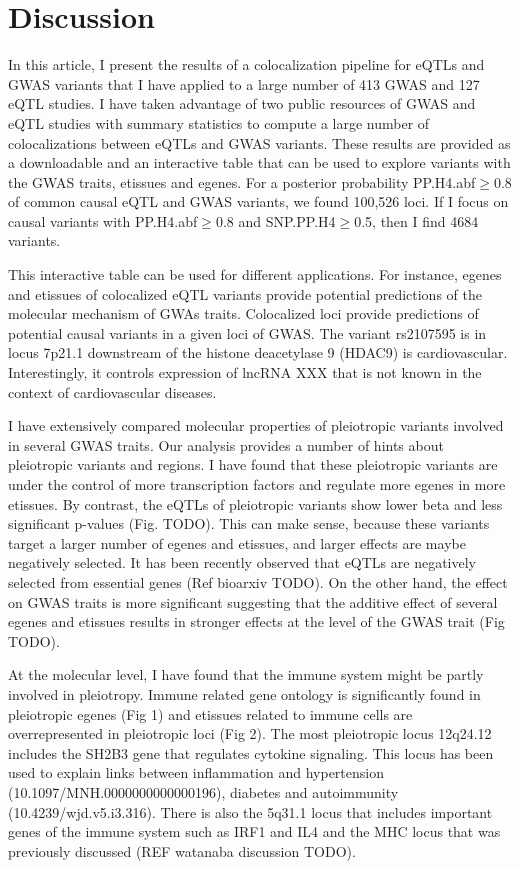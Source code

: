 \section*{Discussion}

In this article, I present the results of a colocalization pipeline for eQTLs and GWAS variants that I have applied to a large number of 413 GWAS and 127 eQTL studies.
%
I have taken advantage of two public resources of GWAS and eQTL studies with summary statistics to compute a large number of colocalizations between eQTLs and GWAS variants.
%
These results are provided as a downloadable and an interactive table that can be used to explore variants with the GWAS traits, etissues and egenes.
%
For a posterior probability PP.H4.abf$\ge$0.8 of common causal eQTL and GWAS variants, we found 100,526 loci.
%
If I focus on causal variants with PP.H4.abf$\ge$0.8 and SNP.PP.H4$\ge$0.5, then I find 4684 variants.

This interactive table can be used for different applications.
%
For instance, egenes and etissues of colocalized eQTL variants provide potential predictions of the molecular mechanism of GWAs traits.
%
Colocalized loci provide predictions of potential causal variants in a given loci of GWAS.
%
The variant rs2107595 is in locus 7p21.1 downstream of the histone deacetylase 9 (HDAC9) is cardiovascular. Interestingly, it controls expression of lncRNA XXX that is not known in the context of cardiovascular diseases.


I have extensively compared molecular properties of pleiotropic variants involved in several GWAS traits.
%
Our analysis provides a number of hints about pleiotropic variants and regions.
%
I have found that these pleiotropic variants are under the control of more transcription factors and regulate more egenes in more etissues.
%
By contrast, the eQTLs of pleiotropic variants show lower beta and less significant p-values (Fig. TODO).
%
This can make sense, because these variants target a larger number of egenes and etissues, and larger effects are maybe negatively selected.
%
It has been recently observed that eQTLs are negatively selected from essential genes (Ref bioarxiv TODO).
%
On the other hand, the effect on GWAS traits is more significant suggesting that the additive effect of several egenes and etissues results in stronger effects at the level of the GWAS trait (Fig TODO).


At the molecular level, I have found that the immune system might be partly involved in pleiotropy.
%
Immune related gene ontology is significantly found in pleiotropic egenes (Fig 1) and etissues related to immune cells are overrepresented in pleiotropic loci (Fig 2).
%
The most pleiotropic locus 12q24.12 includes the SH2B3 gene that regulates cytokine signaling.
%
This locus has been used to explain links between inflammation and hypertension (10.1097/MNH.0000000000000196), diabetes and autoimmunity (10.4239/wjd.v5.i3.316).
%
There is also the 5q31.1 locus that includes important genes of the immune system such as IRF1 and IL4 and the MHC locus that was previously discussed (REF watanaba discussion TODO).

